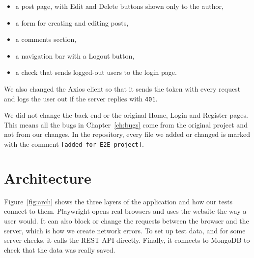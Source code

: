 \documentclass[12pt,a4paper,oneside]{report}
\newcommand{\code}[1]{\texttt{#1}}
\begin{document}
\begin{itemize}[nosep]
  \item a post page, with Edit and Delete buttons shown only to the author,
  \item a form for creating and editing posts,
  \item a comments section,
  \item a navigation bar with a Logout button,
  \item a check that sends logged-out users to the login page.
\end{itemize}

We also changed the Axios client so that it sends the token with every request
and logs the user out if the server replies with \code{401}.

We did not change the back end or the original Home, Login and Register pages.
This means all the bugs in Chapter~\ref{ch:bugs} come from the original
project and not from our changes. In the repository, every file we added or
changed is marked with the comment \code{[added for E2E project]}.

\section{Architecture}

Figure~\ref{fig:arch} shows the three layers of the application and how our
tests connect to them. Playwright opens real browsers and uses the website the
way a user would. It can also block or change the requests between the browser
and the server, which is how we create network errors. To set up test data,
and for some server checks, it calls the REST API directly. Finally, it
connects to MongoDB to check that the data was really saved.
\end{document}
